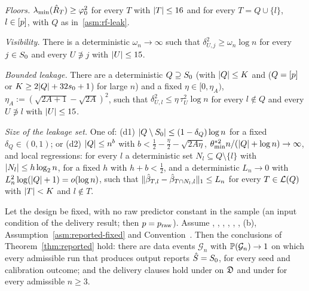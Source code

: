 \begin{localassumption}\label{asm:reported-fixed}
\begin{asmitems}
  \item\label{asm:rf-floor} \emph{Floors.} $\lmin(\Rhat_T)\ge\varphi_0^2$ for every $T$ with $\abs{T}\le16$ and for every
    $T=Q\cup\{l\}$, $l\in\set{p}$, with $Q$ as in~\ref{asm:rf-leak}.
  \item\label{asm:rf-vis} \emph{Visibility.} There is a deterministic $\omega_n\to\infty$ such that
    $\delta^2_{U,j}\ge\omega_n\log n$ for every $j\in\Sz$ and every $U\not\ni j$ with $\abs{U}\le15$.
  \item\label{asm:rf-leak} \emph{Bounded leakage.} There are a deterministic $Q\supseteq\Sz$ (with $\abs{Q}\le K$ and
    ($Q=\set{p}$ or $K\ge2\abs{Q}+32\sz+1$) for large $n$) and a fixed $\eta\in[0,\eta_A)$,
    $\eta_A:=(\sqrt{2A+1}-\sqrt{2A})^2$, such that $\delta^2_{U,l}\le\eta\,\tau^2_U\log n$ for every $l\notin Q$ and every
    $U\not\ni l$ with $\abs{U}\le15$.
  \item\label{asm:rf-size} \emph{Size of the leakage set.} One of: (d1) $\abs{Q\setminus\Sz}\le(1-\delta_Q)\log n$ for a
    fixed $\delta_Q\in(0,1)$; or (d2) $\abs{Q}\le n^b$ with $b<\tfrac12-\tfrac\eta2-\sqrt{2A\eta}$,
    $\theta^{*2}_{\min}n/(\abs{Q}+\log n)\to\infty$, and local regressions: for every $l$ a deterministic set
    $N_l\subseteq Q\setminus\{l\}$ with $\abs{N_l}\le h\log_2n$, for a fixed $h$ with $h+b<\tfrac12$, and a deterministic $L_n\to0$ with
    $L_n^2\log(\abs{Q}+1)=o(\log n)$, such that $\norm{\hat\beta_{T,l}-\hat\beta_{T\cap N_l,l}}_1\le L_n$ for every
    $T\in\Lat(Q)$ with $\abs{T}<K$ and $l\notin T$.
\end{asmitems}
\end{localassumption}

\begin{theorem}\label{thm:reported-fixed}
Let the design be fixed, with no raw predictor constant in the sample (an input condition of the delivery result; then
$p=\praw$). Assume , , , ,
, , (b), Assumption~\ref{asm:reported-fixed} and Convention~. Then the conclusions of
Theorem~\ref{thm:reported} hold: there are data events $\mathcal G_n$ with $\P(\mathcal G_n)\to1$ on which every
admissible run that produces output reports $\Shat=\Sz$, for every seed and calibration outcome; and the delivery
clauses hold under  on $\Dom$ and under  for every admissible $n\ge3$.
\end{theorem}

